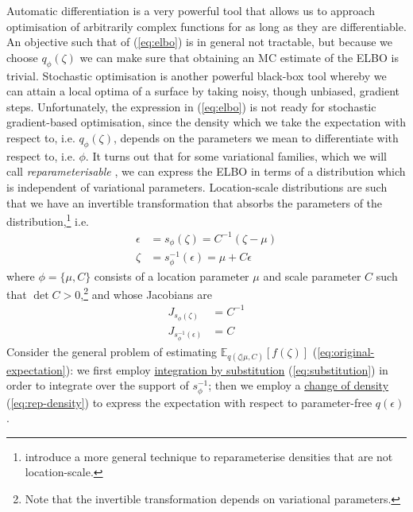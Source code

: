 \documentclass[11pt]{article}
\begin{document}
Automatic differentiation \citep{BaydinEtAl2015AD} is a very powerful tool that allows us to approach optimisation of arbitrarily complex functions for as long as they are differentiable. 
An objective such that of (\ref{eq:elbo}) is in general not tractable, but because we choose $q_\phi(\zeta)$ we can make sure that obtaining an MC estimate of the ELBO is trivial.
Stochastic optimisation \citep{RobbinsEtAl1951SA} is another powerful black-box tool whereby we can attain a local optima of a surface by taking noisy, though unbiased, gradient steps.
Unfortunately, the expression in (\ref{eq:elbo}) is not ready for stochastic gradient-based optimisation, since the density which we take the expectation with respect to, i.e. $q_\phi(\zeta)$, depends on the parameters we mean to differentiate with respect to, i.e. $\phi$.
It turns out that for some variational families, which we will call \emph{reparameterisable} \citep{Kingma+2014:VAE,RezendeEtAl14VAE}, we can express the ELBO in terms of a distribution which is independent of variational parameters.
Location-scale distributions are such that we have an invertible transformation that absorbs the parameters of the distribution,\footnote{\citet{RuizEtAl2016GRep} introduce a more general technique to reparameterise densities that are not location-scale.} i.e.
\begin{subequations}
\begin{align}
\epsilon &= s_\phi(\zeta) = C^{-1}(\zeta - \mu) \\
\zeta &= s_\phi^{-1}(\epsilon) = \mu + C \epsilon
\end{align}
\end{subequations}
where $\phi = \{\mu, C\}$ consists of a location parameter $\mu$ and scale parameter $C$ such that $\det C > 0$,\footnote{Note that the invertible transformation depends on variational parameters.} and whose Jacobians are 
\begin{subequations}
\begin{align}
J_{s_\phi(\zeta)} &=  C^{-1} \\
J_{s_\phi^{-1}(\epsilon)} &=  C
\end{align}
\end{subequations}
Consider the general problem of estimating $\mathbb E_{q(\zeta|\mu, C)}\left[f(\zeta)\right]$ (\ref{eq:original-expectation}): we first employ \href{https://en.wikipedia.org/wiki/Integration_by_substitution\#Substitution_for_multiple_variables}{integration by substitution}  (\ref{eq:substitution}) in order to integrate over the support of $s^{-1}_\phi$;  then we employ a \href{https://en.wikipedia.org/wiki/Integration_by_substitution\#Application_in_probability}{change of density} (\ref{eq:rep-density}) to express the expectation with respect to parameter-free $q(\epsilon)$.
\end{document}
